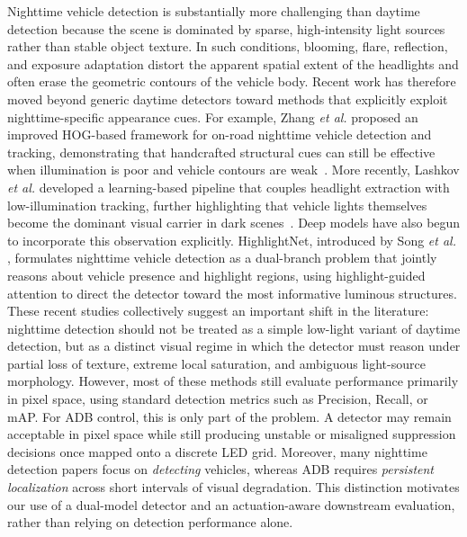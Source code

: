 \documentclass[pdflatex,sn-mathphys-num]{sn-jnl}%
\theoremstyle{thmstyleone}%
\theoremstyle{thmstyletwo}%
\theoremstyle{thmstylethree}%
\begin{document}
Nighttime vehicle detection is substantially more challenging than daytime detection because the scene is dominated by sparse, high-intensity light
sources rather than stable object texture. In such conditions, blooming, flare, reflection, and exposure adaptation distort the apparent spatial extent of the headlights and often erase the geometric contours of the vehicle body. Recent work has therefore moved beyond generic daytime detectors toward methods that explicitly exploit nighttime-specific
appearance cues. For example, Zhang \emph{et al.} proposed an improved HOG-based framework for on-road nighttime vehicle detection and tracking, demonstrating that handcrafted structural cues can still be effective when illumination is poor and vehicle contours are weak~\cite{zhang2024vision}.
More recently, Lashkov \emph{et al.} developed a learning-based pipeline that couples headlight extraction with low-illumination tracking, further highlighting that vehicle lights themselves become the dominant visual
carrier in dark scenes~\cite{lashkov2025machine}.
Deep models have also begun to incorporate this observation explicitly. HighlightNet, introduced by Song \emph{et al.} \cite{song2025highlightnet}, formulates nighttime vehicle detection as a dual-branch problem that jointly reasons about vehicle presence and highlight regions, using highlight-guided attention to direct the detector toward the most informative luminous structures. These recent studies collectively suggest an important shift in the literature: nighttime detection should not be treated as a simple low-light variant of daytime detection, but as a distinct visual regime in which the detector must reason under partial loss of texture, extreme local saturation, and ambiguous light-source morphology.
However, most of these methods still evaluate performance primarily in pixel space, using standard detection metrics such as Precision, Recall, or mAP. For ADB control, this is only part of the problem. A detector may remain acceptable in pixel space while still producing unstable or misaligned suppression decisions once mapped onto a discrete LED grid. Moreover, many nighttime detection papers focus on \emph{detecting} vehicles, whereas ADB requires \emph{persistent localization} across short intervals of visual degradation. This distinction motivates our use of a
dual-model detector and an actuation-aware downstream evaluation, rather
than relying on detection performance alone.

\end{document}

